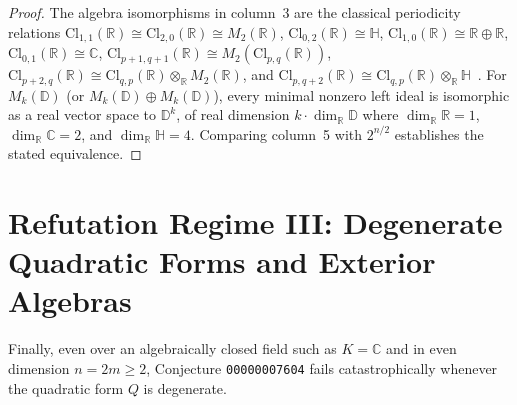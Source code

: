 \documentclass[11pt,a4paper]{article}
\theoremstyle{plain}
\theoremstyle{definition}
\theoremstyle{remark}
\newcommand{\Cl}{\mathrm{Cl}}
\begin{document}
\begin{proof}
The algebra isomorphisms in column~3 are the classical periodicity relations $\Cl_{1,1}(\mathbb{R}) \cong \Cl_{2,0}(\mathbb{R}) \cong M_2(\mathbb{R})$, $\Cl_{0,2}(\mathbb{R}) \cong \mathbb{H}$, $\Cl_{1,0}(\mathbb{R}) \cong \mathbb{R} \oplus \mathbb{R}$, $\Cl_{0,1}(\mathbb{R}) \cong \mathbb{C}$, $\Cl_{p+1,q+1}(\mathbb{R}) \cong M_2(\Cl_{p,q}(\mathbb{R}))$, $\Cl_{p+2,q}(\mathbb{R}) \cong \Cl_{q,p}(\mathbb{R}) \otimes_{\mathbb{R}} M_2(\mathbb{R})$, and $\Cl_{p,q+2}(\mathbb{R}) \cong \Cl_{q,p}(\mathbb{R}) \otimes_{\mathbb{R}} \mathbb{H}$~\cite{AtiyahBottShapiro1964,LawsonMichelsohn1989}. For $M_k(\mathbb{D})$ (or $M_k(\mathbb{D}) \oplus M_k(\mathbb{D})$), every minimal nonzero left ideal is isomorphic as a real vector space to $\mathbb{D}^k$, of real dimension $k \cdot \dim_{\mathbb{R}}\mathbb{D}$ where $\dim_{\mathbb{R}} \mathbb{R} = 1$, $\dim_{\mathbb{R}} \mathbb{C} = 2$, and $\dim_{\mathbb{R}} \mathbb{H} = 4$. Comparing column~5 with $2^{n/2}$ establishes the stated equivalence.
\end{proof}

\section{Refutation Regime III: Degenerate Quadratic Forms and Exterior Algebras}

Finally, even over an algebraically closed field such as $K = \mathbb{C}$ and in even dimension $n = 2m \ge 2$, Conjecture \texttt{00000007604} fails catastrophically whenever the quadratic form $Q$ is degenerate.
\end{document}

